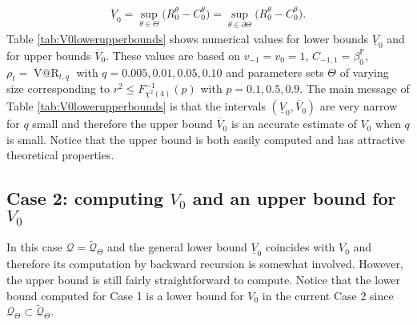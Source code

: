 \documentclass[11pt,a4paper]{article}
\makeatletter
\newcommand{\VaR}{\operatorname{V@R}}
\renewcommand{\P}{\mathbb{P}}
\newcommand{\calQ}{\mathcal{Q}}
\makeatother
\begin{document}
\begin{align*}
\underline{V}_0=\sup_{\theta\in \Theta}\big(R_0^{\theta}-C_0^{\theta}\big)
=\sup_{\theta\in \partial \Theta}\big(R_0^{\theta}-C_0^{\theta}\big).
\end{align*}
Table \ref{tab:V0lowerupperbounds} shows numerical values for lower bounds $\underline{V}_0$ and for upper bounds $\overline{V}_0$. These values are based on 
$v_{-1}=v_0=1$, $C_{-1,1}=\beta_0^{\P}$, 
$\rho_t=\VaR_{t,q}$ with $q=0.005,0.01,0.05,0.10$ and parameters sets $\Theta$ of varying size corresponding to $r^2\leq F_{\chi^2(4)}^{-1}(p)$ with $p=0.1,0.5,0.9$. The main message of Table \ref{tab:V0lowerupperbounds} is that the intervals $(\underline{V}_0,\overline{V}_0)$ are very narrow for $q$ small and therefore the upper bound $\overline{V}_0$ is an accurate estimate of $V_0$ when $q$ is small. Notice that the upper bound is both easily computed and has attractive theoretical properties.  

\subsection{Case 2: computing $V_0$ and an upper bound for $V_0$}

In this case $\calQ=\widetilde{\calQ}_{\Theta}$ and the general lower bound $\underline{V}_0$ coincides with $V_0$ and therefore its computation by backward recursion is somewhat involved. However, the upper bound is still fairly straightforward to compute. Notice that the lower bound computed for Case 1 is a lower bound for $V_0$ in the current Case 2 since $\calQ_{\Theta}\subset \widetilde{\calQ}_{\Theta}$. 
\end{document}
